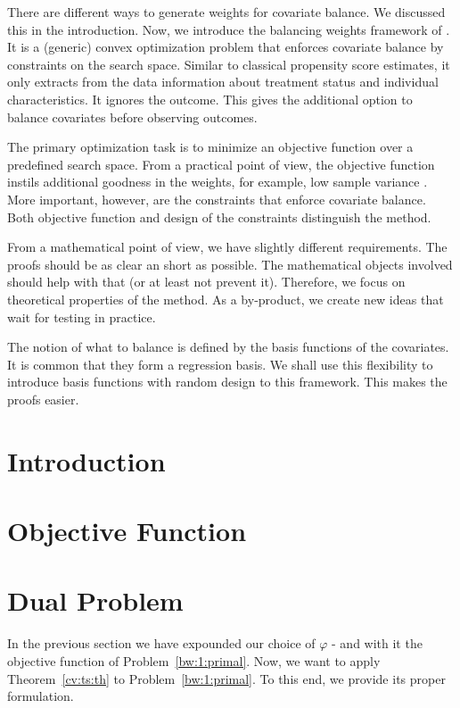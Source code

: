 There are different ways
to generate weights for covariate balance.
%
We discussed this in the introduction.
%
Now, we introduce the balancing weights framework of \cite{Wang2019}.
%
It is a (generic) convex optimization problem
that enforces covariate balance by constraints on the search space.
%
Similar to classical propensity score estimates, it only
extracts from the data information about treatment status and individual characteristics.
%
It ignores the outcome.
%
This gives the additional option to balance covariates before observing outcomes.

%
The primary optimization task is to minimize an objective function
over a predefined search space.
%
From a practical point of view, the objective function
instils additional goodness in the weights, 
for example, 
low sample variance \cite[Introduction]{Zubizarreta2015}. 
%
%
More important, however, are the constraints that enforce covariate balance.
%
Both objective function and design of the constraints distinguish the method.
%

From a mathematical point of view,
we have slightly different requirements.
%
The proofs should be as clear an short as possible.
%
The mathematical objects involved should help with that
(or at least not prevent it).
%
Therefore, we focus on theoretical properties
of the method.
%
As a by-product, we create new ideas that wait for testing in practice.

%
The notion of what to balance is defined by the basis functions of the covariates.
%
It is common that they form a regression basis.
%
We shall use this flexibility to introduce basis functions with random design to this framework.
%
This makes the proofs easier.
\section{Introduction}

\nopagebreak

\section{Objective Function}

\section{Dual Problem}
In the previous section we have expounded our choice of $\varphi$ - and with it the objective function of Problem~\ref{bw:1:primal}.
%
Now, we want to apply Theorem~\ref{cv:ts:th} to Problem~\ref{bw:1:primal}.
%
To this end, we provide its proper formulation.
%


